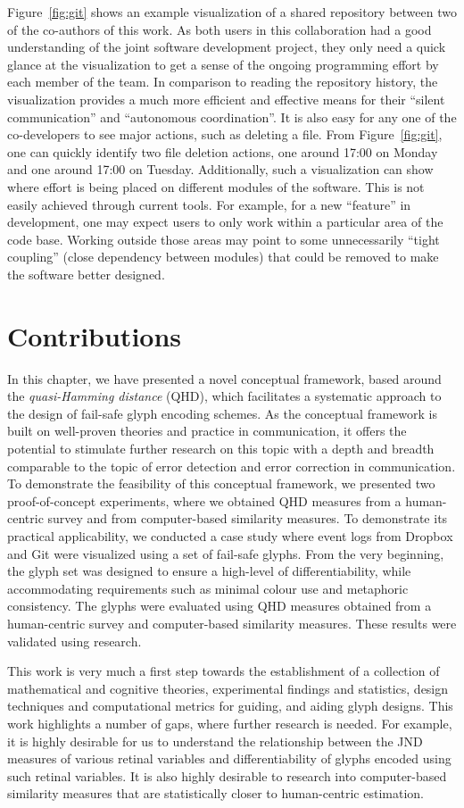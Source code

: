 Figure~\ref{fig:git} shows an example visualization of a shared repository between two of the co-authors of this work.
As both users in this collaboration had a good understanding of the joint software development project, they only need a quick glance at the visualization to get a sense of the ongoing programming effort by each member of the team.
In comparison to reading the repository history, the visualization provides a much more efficient and effective means for their ``silent communication'' and ``autonomous coordination''.
It is also easy for any one of the co-developers to see major actions, such as deleting a file.
From Figure~\ref{fig:git}, one can quickly identify two file deletion actions, one around 17:00 on Monday and one around 17:00 on Tuesday.
Additionally, such a visualization can show where effort is being placed on different modules of the software.
This is not easily achieved through current tools. 
For example, for a new ``feature'' in development, one may expect users to only work within a particular area of the code base. 
Working outside those areas may point to some unnecessarily ``tight coupling'' (close dependency between modules) that could be removed to make the software better designed.


\section{Contributions}
\label{sec:conclusion}
%
In this chapter, we have presented a novel conceptual framework, based around the \emph{quasi-Hamming distance} (QHD), which facilitates a systematic approach to the design of fail-safe glyph encoding schemes.
As the conceptual framework is built on well-proven theories and practice in communication, it offers the potential to stimulate further research on this topic with a depth and breadth comparable to the topic of error detection and error correction in communication.
To demonstrate the feasibility of this conceptual framework, we presented two proof-of-concept experiments, where we obtained QHD measures from a human-centric survey and from computer-based similarity measures.
To demonstrate its practical applicability, we conducted a case study where event logs from Dropbox and Git were visualized using a set of fail-safe glyphs.
From the very beginning, the glyph set was designed to ensure a high-level of differentiability, while accommodating requirements such as minimal colour use and metaphoric consistency.
The glyphs were evaluated using QHD measures obtained from a human-centric survey and computer-based similarity measures.
These results were validated using research.

This work is very much a first step towards the establishment of a collection of mathematical and cognitive theories, experimental findings and statistics, design techniques and computational metrics for guiding, and aiding glyph designs.
This work highlights a number of gaps, where further research is needed.
For example, it is highly desirable for us to understand the relationship between the JND measures of various retinal variables and differentiability of glyphs encoded using such retinal variables.
It is also highly desirable to research into computer-based similarity measures that are statistically closer to human-centric estimation.